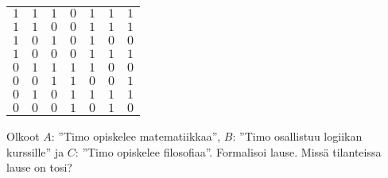 \begin{tehtava}
\begin{vastaus}
\begin{alakohdat}
{\begin{center}
\begin{tabular}{|c|c|c|c|c|c|c|}
		    $1$ & $1$ & $1$ & $0$ & $1$ & $1$ & $1$ \\ %
		    $1$ & $1$ & $0$ & $0$ & $1$ & $1$ & $1$ \\
		    $1$ & $0$ & $1$ & $0$ & $1$ & $0$ & $0$ \\
		    $1$ & $0$ & $0$ & $0$ & $1$ & $1$ & $1$ \\
		    $0$ & $1$ & $1$ & $1$ & $1$ & $0$ & $0$ \\
		    $0$ & $0$ & $1$ & $1$ & $0$ & $0$ & $1$ \\
		    $0$ & $1$ & $0$ & $1$ & $1$ & $1$ & $1$ \\
		    $0$ & $0$ & $0$ & $1$ & $0$ & $1$ & $0$ \\ \hline
\end{tabular}
\end{center}}
        \end{alakohdat}
    \end{vastaus}
    
\end{tehtava}

\begin{tehtava}
     Olkoot $A$: ''Timo opiskelee matematiikkaa'', $B$: ''Timo osallistuu logiikan kurssille'' ja $C$: ''Timo opiskelee filosofiaa''. Formalisoi lause. Missä tilanteissa lause on tosi?
    \begin{alakohdat}
    \end{alakohdat}

    \begin{vastaus}
    
        \begin{alakohdat}
        \end{alakohdat}
    \end{vastaus}
    
\end{tehtava}


